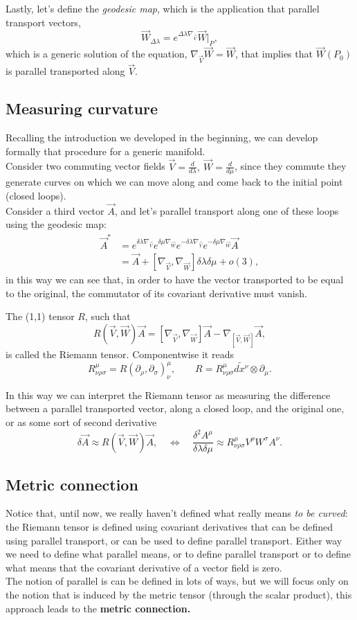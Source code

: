 Lastly, let's define the \emph{geodesic map}, which is the application that parallel transport vectors, $$\vec W_{\Delta \lambda}=e^{\Delta\lambda\nabla_{\vec V}}\vec W\bigg|_{P},$$which is a generic solution of the equation, $\nabla_{\vec V}\vec W=\vec W$, that implies that $\vec W(P_0)$ is parallel transported along $\vec V$. 

\subsection{Measuring curvature}
Recalling the introduction we developed in the beginning, we can develop formally that procedure for a generic manifold.\\Consider two commuting vector fields $\vec V=\frac{d}{d\lambda},\ \vec W=\frac{d}{d\mu}$, since they commute they generate curves on which we can move along and come back to the initial point (closed loops).\\
Consider a third vector $\vec A$, and let's parallel transport along one of these loops using the geodesic map:
\begin{align*}
    \vec A^*&=e^{\delta\lambda\nabla_{\vec V}}e^{\delta\mu\nabla_{\vec W}}e^{-\delta\lambda\nabla_{\vec V}}e^{-\delta\mu\nabla_{\vec W}}\vec A\\
    &=\vec A +[\nabla_{\vec V},\nabla_{\vec W}]\delta\lambda\delta\mu+o(3),
\end{align*}
in this way we can see that, in order to have the vector transported to be equal to the original, the commutator of its covariant derivative must vanish.
\begin{defin}
    The (1,1) tensor $R$, such that$$R(\vec V,\vec W)\vec A=[\nabla_{\vec V},\nabla_{\vec W}] \vec A-\nabla_{[\vec V,\vec W]}\vec A,$$
    is called the Riemann tensor. Componentwise it reads $$ R^\mu_{\nu\rho\sigma}=R(\partial_\rho,\partial_\sigma)_\nu^\mu,\qquad R=R^\mu_{\nu\rho\sigma} \tilde{dx^\nu}\otimes\partial_\mu.$$
\end{defin}
In this way we can interpret the Riemann tensor as measuring the difference between a parallel transported vector, along a closed loop, and the original one, or as some sort of second derivative $$\delta\vec A\approx R(\vec V,\vec W)\vec A,\quad \Leftrightarrow\quad \frac{\delta^2A^\mu}{\delta\lambda\delta\mu}\approx R^\mu_{\nu\rho\sigma}V^\rho W^\sigma A^\nu.$$
\subsection{Metric connection}
Notice that, until now, we really haven't defined what really means \emph{to be curved}: the Riemann tensor is defined using covariant derivatives that can be defined using parallel transport, or can be used to define parallel transport. Either way we need to define what parallel means, or to define parallel transport or to define what means that the covariant derivative of a vector field is zero.\\
The notion of parallel is can be defined in lots of ways, but we will focus only on the notion that is induced by the metric tensor (through the scalar product), this approach leads to the \textbf{metric connection.}\\

